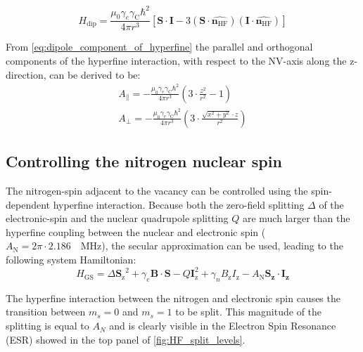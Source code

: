 \begin{equation}
\label{eq:dipole_component_of_hyperfine}
H_{\mathrm{dip}} = \frac{\mu_0 \gamma_e \gamma_{\mathrm{C}} \hbar^2 }{4 \pi r^3} [ \bm{S \cdot I} - 3 (\bm S \cdot \hat{\bm{n_{\mathrm{HF}}}})(\bm I \cdot \hat{\bm{n_{\mathrm{HF}}}})]
\end{equation}

From \cref{eq:dipole_component_of_hyperfine}  the parallel and orthogonal components of the hyperfine interaction, with respect to the NV-axis along the z-direction, can be derived to be:
 \begin{align}
A_\parallel= - \frac{\mu_0 \gamma_e \gamma_{\mathrm{C}} \hbar^2 }{4 \pi r^3} \left(3\cdot \frac{z^2}{r^2}-1\right)\\
 A_\perp =  -\frac{\mu_0 \gamma_e \gamma_{\mathrm{C}} \hbar^2 }{4 \pi r^3}\left( 3\cdot\frac{\sqrt{x^2+y^2}\cdot z}{r^2}\right)
\end{align}


\subsection{Controlling the nitrogen nuclear spin}
The nitrogen-spin adjacent to the vacancy can be controlled using the spin-dependent hyperfine interaction.
Because both the zero-field splitting $\Delta$ of the electronic-spin and the nuclear quadrupole splitting $Q$ are much larger than the hyperfine coupling between the nuclear and electronic spin ($A_\mathrm{N} = 2\pi \cdot 2.186\quad \mathrm{MHz} $), the secular approximation can be used, leading to the following system Hamiltonian:
\begin{equation}
        H_\mathrm{GS} = \Delta {\bm{S}_\mathrm{z}}^2 + \gamma_e \bm{B} \cdot \bm{S} -Q\bm{I}_{\mathrm{z}}^2+\gamma_{n} B_\mathrm{z} I_\mathrm{z} - A_\mathrm{N} \bm{S_z}\cdot \bm{I_z}
\end{equation}

The hyperfine interaction between the nitrogen and electronic spin causes the transition between $m_s=0$ and $m_s =1$ to be split.
This magnitude of the splitting is equal to $A_N$ and  is clearly visible in the Electron Spin Resonance (ESR) showed in the top panel of \cref{fig:HF_split_levels}.


